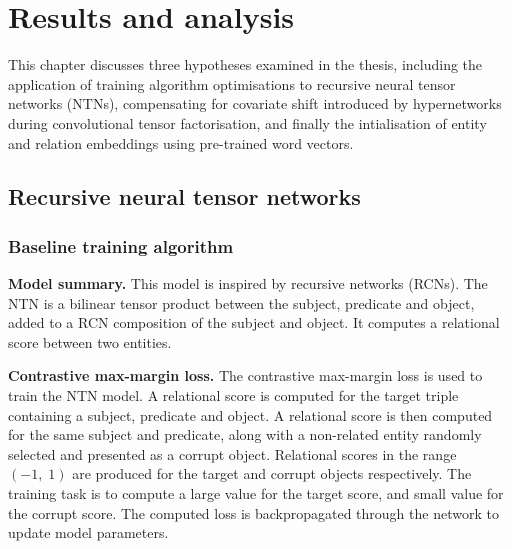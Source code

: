 

\chapter{Results and analysis}  %

\ifpdf
     \graphicspath{{Figs/Chapter4/}}
\else
    \graphicspath{{Chapter4/Figs/Vector/}{Chapter4/Figs/}}
\fi

This chapter discusses three hypotheses examined in the thesis, including the application of training algorithm optimisations to recursive neural tensor networks (NTNs), compensating for covariate shift introduced by hypernetworks during convolutional tensor factorisation, and finally the intialisation of entity and relation embeddings using pre-trained word vectors. 



\section{Recursive neural tensor networks}

\subsection{Baseline training algorithm}
\textbf{Model summary.} This model is inspired by recursive networks (RCNs). The NTN is a bilinear tensor product between the subject, predicate and object, added to a RCN composition of the subject and object. It computes a relational score between two entities. 

\noindent \textbf{Contrastive max-margin loss.} The contrastive max-margin loss is used to train the NTN model. A relational score is computed for the target triple containing a subject, predicate and object. A relational score is then computed for the same subject and predicate, along with a non-related entity randomly selected and presented as a corrupt object. Relational scores in the range $ (-1, \; 1) $ are produced for the target and corrupt objects respectively. The training task is to compute a large value for the target score, and small value for the corrupt score. The computed loss is backpropagated through the network to update model parameters. \par

